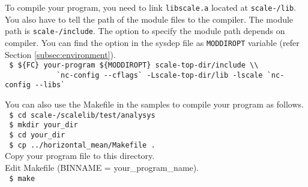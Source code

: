 To compile your program, you need to link \verb|libscale.a| located at \texttt{scale-\version/lib}.
You also have to tell the path of the module files to the compiler.
The module path is \texttt{scale-\version/include}.
The option to specify the module path depends on compiler.
You can find the option in the sysdep file as \verb|MODDIROPT| variable (refer Section \ref{subsec:environment}).\\
\verb| $ ${FC} your-program ${MODDIROPT} scale-top-dir/include \\|\\
\verb|            `nc-config --cflags` -Lscale-top-dir/lib -lscale `nc-config --libs`|

You can also use the Makefile in the samples to compile your program as follows.\\
\texttt{ \$ cd scale-\version/scalelib/test/analysys}\\
\texttt{ \$ mkdir your\_dir}\\
\texttt{ \$ cd your\_dir}\\
\texttt{ \$ cp ../horizontal\_mean/Makefile .}\\
Copy your program file to this directory.\\
Edit Makefile (BINNAME = your\_program\_name).\\
\texttt{ \$ make}

